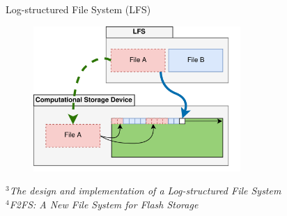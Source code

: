 \documentclass{beamer}
\begin{document}
\begin{frame}{Log-structured File System (LFS)}
	\begingroup
	\small
	\begin{figure}
		\centering
		\includegraphics[width=0.7\textwidth]{resources/images/lfs.png}
	\end{figure}
	\textit{\tiny $^{3}$The design and implementation of a Log-structured File System \\}
	\textit{\tiny $^{4}$F2FS: A New File System for Flash Storage}
	\endgroup
\end{frame}
\end{document}
